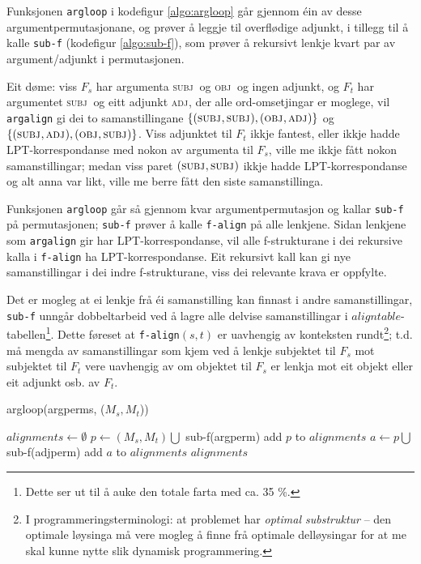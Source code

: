 \documentclass[12pt,a4paper,oneside,draft]{report}
\newcommand{\F}[2]{\textsc{#1}\ensuremath{_{#2}}}
\newcommand{\OBJ}{\F{obj}{}}
\newcommand{\OBJs}{\F{obj~}{}}
\newcommand{\ADJ}{\F{adj}{}}
\newcommand{\SUBJ}{\F{subj}{}}
\newcommand{\SUBJs}{\F{subj~}{}}
\begin{document}
 Funksjonen \texttt{argloop} i kodefigur \ref{algo:argloop} går gjennom éin
 av desse argumentpermutasjonane, og prøver å leggje til overflødige
 adjunkt, i tillegg til å kalle \texttt{sub-f} (kodefigur \ref{algo:sub-f}),
 som prøver å rekursivt lenkje kvart par av argument/adjunkt i
 permutasjonen.

 Eit døme: viss $F_s$ har argumenta \SUBJs og \OBJs og ingen adjunkt,
 og $F_t$ har argumentet \SUBJs og eitt adjunkt \ADJ, der alle
 ord-omsetjingar er moglege, vil \texttt{argalign} gi dei to samanstillingane
 $\{(\SUBJ,\SUBJ), (\OBJ,\ADJ)\}$ og $\{(\SUBJ,\ADJ),
 (\OBJ,\SUBJ)\}$. Viss adjunktet til $F_t$ ikkje fantest, eller ikkje
 hadde LPT-korrespondanse med nokon av argumenta til $F_s$, ville me
 ikkje fått nokon samanstillingar; medan viss paret $(\SUBJ,\SUBJ)$
 ikkje hadde LPT-korrespondanse og alt anna var likt, ville me berre
 fått den siste samanstillinga.

 Funksjonen \texttt{argloop} går så gjennom kvar argumentpermutasjon og
 kallar \texttt{sub-f} på permutasjonen; \texttt{sub-f} prøver å kalle \texttt{f-align} på
 alle lenkjene. Sidan lenkjene som \texttt{argalign} gir har
 LPT-korrespondanse, vil alle f-strukturane i dei rekursive kalla i
 \texttt{f-align} ha LPT-korrespondanse. Eit rekursivt kall kan gi nye
 samanstillingar i dei indre f-strukturane, viss dei relevante krava
 er oppfylte.

 Det er mogleg at ei lenkje frå éi samanstilling kan finnast i andre
 samanstillingar, \texttt{sub-f} unngår dobbeltarbeid ved å lagre alle
 delvise samanstillingar i $aligntable$-tabellen\footnote{Dette ser ut til å auke den totale farta med ca. 35 \%. }. Dette føreset
 at \texttt{f-align}$(s,t)$ er uavhengig av konteksten rundt\footnote{I programmeringsterminologi: at problemet har \emph{optimal         substruktur} -- den optimale løysinga må vere mogleg å finne
        frå optimale delløysingar for at me skal kunne nytte slik
        dynamisk programmering. };
 t.d. må mengda av samanstillingar som kjem ved å lenkje subjektet til
 $F_s$ mot subjektet til $F_t$ vere uavhengig av om objektet til $F_s$
 er lenkja mot eit objekt eller eit adjunkt osb. av $F_t$.

  \begin{algorithm}[]
    \caption{argloop(argperms, ($M_s,M_t$))}
    \label{algo:argloop}

    $alignments \gets \emptyset$  \;
     {
       {
        $p \gets (M_s,M_t) \bigcup$ sub-f(argperm)
        add $p$ to $alignments$ \;
         {
          $a \gets p \bigcup$ sub-f(adjperm)  
          add $a$ to $alignments$\;
        } %
      } %
    }
    \Return $alignments$
  \end{algorithm}    
  
\end{document}
